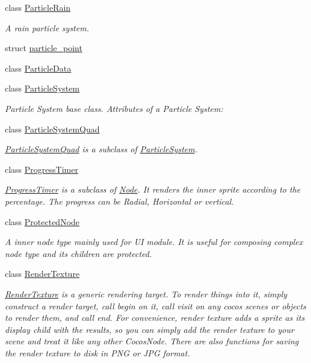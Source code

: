 \begin{DoxyCompactItemize}
class \hyperlink{classParticleRain}{Particle\+Rain}
\begin{DoxyCompactList}\small\item\em A rain particle system. \end{DoxyCompactList}\item 
struct \hyperlink{structparticle__point}{particle\+\_\+point}
\item 
class \hyperlink{classParticleData}{Particle\+Data}
\item 
class \hyperlink{classParticleSystem}{Particle\+System}
\begin{DoxyCompactList}\small\item\em Particle System base class. Attributes of a Particle System\+: \end{DoxyCompactList}\item 
class \hyperlink{classParticleSystemQuad}{Particle\+System\+Quad}
\begin{DoxyCompactList}\small\item\em \hyperlink{classParticleSystemQuad}{Particle\+System\+Quad} is a subclass of \hyperlink{classParticleSystem}{Particle\+System}. \end{DoxyCompactList}\item 
class \hyperlink{classProgressTimer}{Progress\+Timer}
\begin{DoxyCompactList}\small\item\em \hyperlink{classProgressTimer}{Progress\+Timer} is a subclass of \hyperlink{classNode}{Node}. It renders the inner sprite according to the percentage. The progress can be Radial, Horizontal or vertical. \end{DoxyCompactList}\item 
class \hyperlink{classProtectedNode}{Protected\+Node}
\begin{DoxyCompactList}\small\item\em A inner node type mainly used for UI module. It is useful for composing complex node type and it\textquotesingle{}s children are protected. \end{DoxyCompactList}\item 
class \hyperlink{classRenderTexture}{Render\+Texture}
\begin{DoxyCompactList}\small\item\em \hyperlink{classRenderTexture}{Render\+Texture} is a generic rendering target. To render things into it, simply construct a render target, call begin on it, call visit on any cocos scenes or objects to render them, and call end. For convenience, render texture adds a sprite as it\textquotesingle{}s display child with the results, so you can simply add the render texture to your scene and treat it like any other Cocos\+Node. There are also functions for saving the render texture to disk in P\+NG or J\+PG format. \end{DoxyCompactList}\item 

\end{DoxyCompactItemize}
